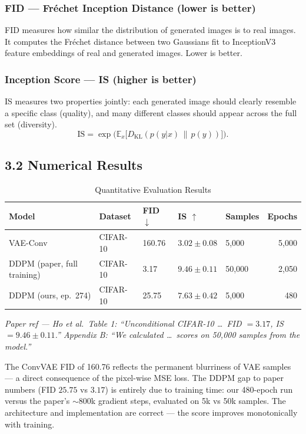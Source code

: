 \documentclass{article}
\newcommand{\paperref}[1]{{\color{paperrefcolor}\emph{#1}}}
\begin{document}
\subsubsection*{FID --- Fr\'{e}chet Inception Distance (lower is better)}
FID measures how similar the distribution of generated images is to real images. It computes the Fr\'{e}chet distance between two Gaussians fit to InceptionV3 feature embeddings of real and generated images. Lower is better.

\subsubsection*{Inception Score --- IS (higher is better)}
IS measures two properties jointly: each generated image should clearly resemble a specific class (quality), and many different classes should appear across the full set (diversity). 
\[
  \mathrm{IS} = \exp\!\bigl(\mathbb{E}_x\bigl[D_{\mathrm{KL}}(p(y|x)\,\|\,p(y))\bigr]\bigr).
\]

\subsection{3.2 \; Numerical Results}

\begin{table}[H]
\centering
\caption{Quantitative Evaluation Results}
\begin{tabular}{lllllr}
\toprule
\textbf{Model} & \textbf{Dataset} & \textbf{FID $\downarrow$} & \textbf{IS $\uparrow$} & \textbf{Samples} & \textbf{Epochs} \\
\midrule
VAE-Conv                    & CIFAR-10 & 160.76      & $3.02 \pm 0.08$  & 5,000  & 5,000 \\
DDPM (paper, full training) & CIFAR-10 & 3.17        & $9.46 \pm 0.11$  & 50,000 & 2,050 \\
DDPM (ours, ep.\ 274) & CIFAR-10 & 25.75   & $7.63 \pm 0.42$  & 5,000  & 480   \\
\bottomrule
\end{tabular}
\end{table}

\paperref{Paper ref --- Ho et al.\ Table 1: ``Unconditional CIFAR-10 \ldots\ FID $= 3.17$, IS $= 9.46 \pm 0.11$.'' Appendix B: ``We calculated \ldots\ scores on 50,000 samples from the model.''}

The ConvVAE FID of 160.76 reflects the permanent blurriness of VAE samples --- a direct consequence of the pixel-wise MSE loss. The DDPM gap to paper numbers (FID $25.75$ vs $3.17$) is entirely due to training time: our 480-epoch run versus the paper's ${\sim}800$k gradient steps, evaluated on 5k vs 50k samples. The architecture and implementation are correct --- the score improves monotonically with training.
\end{document}
